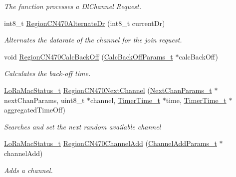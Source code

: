 \begin{DoxyCompactItemize}
\begin{DoxyCompactList}\small\item\em The function processes a Dl\+Channel Request. \end{DoxyCompactList}\item 
int8\+\_\+t \mbox{\hyperlink{group___r_e_g_i_o_n_c_n470_gaed1dc3304fd0c26cbd5ff5d6177954d5}{Region\+C\+N470\+Alternate\+Dr}} (int8\+\_\+t current\+Dr)
\begin{DoxyCompactList}\small\item\em Alternates the datarate of the channel for the join request. \end{DoxyCompactList}\item 
void \mbox{\hyperlink{group___r_e_g_i_o_n_c_n470_ga2020e2db0351b7010e2e5fd53c466cc2}{Region\+C\+N470\+Calc\+Back\+Off}} (\mbox{\hyperlink{group___r_e_g_i_o_n_ga7c5c9a8da174e6679eded8257dc92fd9}{Calc\+Back\+Off\+Params\+\_\+t}} $\ast$calc\+Back\+Off)
\begin{DoxyCompactList}\small\item\em Calculates the back-\/off time. \end{DoxyCompactList}\item 
\mbox{\hyperlink{group___l_o_r_a_m_a_c_ga30bd25657e10480f8605ee951b0ecfbd}{Lo\+Ra\+Mac\+Status\+\_\+t}} \mbox{\hyperlink{group___r_e_g_i_o_n_c_n470_ga462853ffc721358f0c574c2042a0d4fc}{Region\+C\+N470\+Next\+Channel}} (\mbox{\hyperlink{group___r_e_g_i_o_n_ga115f5e83afae352c0a3dcdc193374040}{Next\+Chan\+Params\+\_\+t}} $\ast$next\+Chan\+Params, uint8\+\_\+t $\ast$channel, \mbox{\hyperlink{utilities_8h_a4215ca43d3e953099ea758ce428599d0}{Timer\+Time\+\_\+t}} $\ast$time, \mbox{\hyperlink{utilities_8h_a4215ca43d3e953099ea758ce428599d0}{Timer\+Time\+\_\+t}} $\ast$aggregated\+Time\+Off)
\begin{DoxyCompactList}\small\item\em Searches and set the next random available channel \end{DoxyCompactList}\item 
\mbox{\hyperlink{group___l_o_r_a_m_a_c_ga30bd25657e10480f8605ee951b0ecfbd}{Lo\+Ra\+Mac\+Status\+\_\+t}} \mbox{\hyperlink{group___r_e_g_i_o_n_c_n470_ga6f447bc77fedcf05b61c6a4247b0972b}{Region\+C\+N470\+Channel\+Add}} (\mbox{\hyperlink{group___r_e_g_i_o_n_gab1c5f3aa06614283202906cef4417860}{Channel\+Add\+Params\+\_\+t}} $\ast$channel\+Add)
\begin{DoxyCompactList}\small\item\em Adds a channel. \end{DoxyCompactList}\item 

\end{DoxyCompactItemize}
